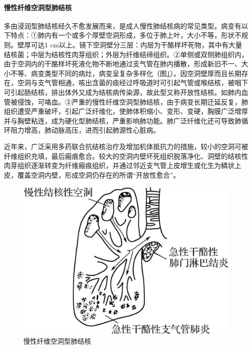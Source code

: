 \paragraph{慢性纤维空洞型肺结核}
多由浸润型肺结核经久不愈发展而来，是成人慢性肺结核病的常见类型。病变有以下特点：①肺内有一个或多个厚壁空洞形成，多位于肺上叶，大小不等，形状不规则。壁厚可达1
cm以上。镜下空洞壁分三层：内层为干酪样坏死物，其中有大量结核菌；中层为结核性肉芽组织；外层为纤维结缔组织。②单侧或双侧肺组织内，由于空洞内的干酪样坏死液化物不断地通过支气管在肺内播散，形成新旧不一、大小不等、病变类型不同的病灶，病变呈复杂多样化（图\ref{fig14-5}）。因空洞壁厚而且长期存在，空洞与支气管相通，咳出含菌的痰经过呼吸道时可引起气管或喉结核，被咽下可引起肠结核，排出体外又成为结核病传染源，故此型又称开放性结核。如肺内血管被侵蚀，可咯血。③严重的慢性纤维空洞型肺结核，由于病变长期迁延反复，肺组织遭受严重破坏，引起广泛纤维化，使肺体积缩小、变形、变硬，胸膜广泛增厚并与胸壁粘连，成为硬化型肺结核，严重影响肺功能。肺广泛纤维化还可导致肺循环阻力增高，肺动脉高压，进而引起肺源性心脏病。

近年来，广泛采用多药联合抗结核治疗及增加机体抵抗力的措施，较小的空洞可被纤维组织充填，最后瘢痕愈合。较大的空洞内壁坏死组织脱落净化、洞壁的结核性肉芽组织逐渐转变为纤维瘢痕组织，并通过邻近支气管上皮增生或化生为鳞状上皮，覆盖空洞内壁，形成空洞仍存在的所谓“开放性愈合”。

\begin{figure}[!htbp]
    \centering
    \includegraphics{./images/Image00229.jpg}
    \captionsetup{justification=centering}
    \caption{慢性纤维空洞型肺结核}
    \label{fig14-5}
\end{figure}

